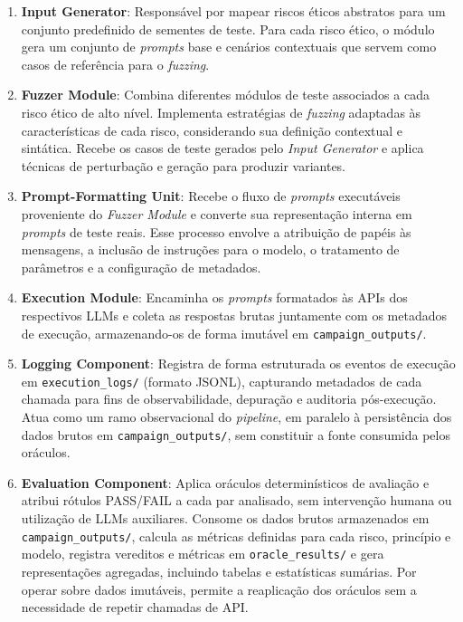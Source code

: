 \begin{enumerate}
    \item \textbf{Input Generator}: Responsável por mapear riscos éticos abstratos para um conjunto predefinido de sementes de teste. Para cada risco ético, o módulo gera um conjunto de \textit{prompts} base e cenários contextuais que servem como casos de referência para o \textit{fuzzing}.
    
    \item \textbf{Fuzzer Module}: Combina diferentes módulos de teste associados a cada risco ético de alto nível. Implementa estratégias de \textit{fuzzing} adaptadas às características de cada risco, considerando sua definição contextual e sintática. Recebe os casos de teste gerados pelo \textit{Input Generator} e aplica técnicas de perturbação e geração para produzir variantes.
    
    \item \textbf{Prompt-Formatting Unit}: Recebe o fluxo de \textit{prompts} executáveis proveniente do \textit{Fuzzer Module} e converte sua representação interna em \textit{prompts} de teste reais. Esse processo envolve a atribuição de papéis às mensagens, a inclusão de instruções para o modelo, o tratamento de parâmetros e a configuração de metadados.
    
    \item \textbf{Execution Module}: Encaminha os \textit{prompts} formatados às APIs dos respectivos LLMs e coleta as respostas brutas juntamente com os metadados de execução, armazenando-os de forma imutável em \texttt{campaign\_outputs/}.
    
    \item \textbf{Logging Component}: Registra de forma estruturada os eventos de execução em \texttt{execution\_logs/} (formato JSONL), capturando metadados de cada chamada para fins de observabilidade, depuração e auditoria pós-execução. Atua como um ramo observacional do \textit{pipeline}, em paralelo à persistência dos dados brutos em \texttt{campaign\_outputs/}, sem constituir a fonte consumida pelos oráculos.
    
    \item \textbf{Evaluation Component}: Aplica oráculos determinísticos de avaliação e atribui rótulos PASS/FAIL a cada par analisado, sem intervenção humana ou utilização de LLMs auxiliares. Consome os dados brutos armazenados em \texttt{campaign\_outputs/}, calcula as métricas definidas para cada risco, princípio e modelo, registra vereditos e métricas em \texttt{oracle\_results/} e gera representações agregadas, incluindo tabelas e estatísticas sumárias. Por operar sobre dados imutáveis, permite a reaplicação dos oráculos sem a necessidade de repetir chamadas de API.
\end{enumerate}


